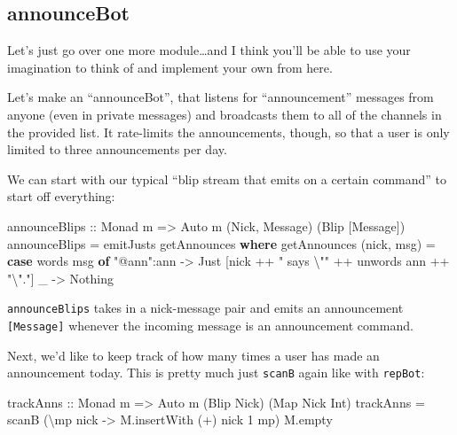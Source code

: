 \documentclass[]{article}
\newenvironment{Shaded}{}{}
\newcommand{\KeywordTok}[1]{\textcolor[rgb]{0.00,0.44,0.13}{\textbf{{#1}}}}
\newcommand{\DataTypeTok}[1]{\textcolor[rgb]{0.56,0.13,0.00}{{#1}}}
\newcommand{\DecValTok}[1]{\textcolor[rgb]{0.25,0.63,0.44}{{#1}}}
\newcommand{\StringTok}[1]{\textcolor[rgb]{0.25,0.44,0.63}{{#1}}}
\newcommand{\OtherTok}[1]{\textcolor[rgb]{0.00,0.44,0.13}{{#1}}}
\newcommand{\FunctionTok}[1]{\textcolor[rgb]{0.02,0.16,0.49}{{#1}}}
\newcommand{\NormalTok}[1]{{#1}}
\begin{document}
\subsection{announceBot}\label{announcebot}

Let's just go over one more module\ldots{}and I think you'll be able to use your
imagination to think of and implement your own from here.

Let's make an ``announceBot'', that listens for ``announcement'' messages from
anyone (even in private messages) and broadcasts them to all of the channels in
the provided list. It rate-limits the announcements, though, so that a user is
only limited to three announcements per day.

We can start with our typical ``blip stream that emits on a certain command'' to
start off everything:

\begin{Shaded}
\begin{Highlighting}[]
\OtherTok{announceBlips ::} \DataTypeTok{Monad} \NormalTok{m }\OtherTok{=>} \DataTypeTok{Auto} \NormalTok{m (}\DataTypeTok{Nick}\NormalTok{, }\DataTypeTok{Message}\NormalTok{) (}\DataTypeTok{Blip} \NormalTok{[}\DataTypeTok{Message}\NormalTok{])}
\NormalTok{announceBlips }\FunctionTok{=} \NormalTok{emitJusts getAnnounces}
  \KeywordTok{where}
    \NormalTok{getAnnounces (nick, msg) }\FunctionTok{=}
      \KeywordTok{case} \NormalTok{words msg }\KeywordTok{of}
        \StringTok{"@ann"}\FunctionTok{:}\NormalTok{ann }\OtherTok{->} \DataTypeTok{Just} \NormalTok{[nick }\FunctionTok{++} \StringTok{" says \textbackslash{}""} \FunctionTok{++} \NormalTok{unwords ann }\FunctionTok{++} \StringTok{"\textbackslash{}"."}\NormalTok{]}
        \NormalTok{_          }\OtherTok{->} \DataTypeTok{Nothing}
\end{Highlighting}
\end{Shaded}

\texttt{announceBlips} takes in a nick-message pair and emits an announcement
\texttt{{[}Message{]}} whenever the incoming message is an announcement command.

Next, we'd like to keep track of how many times a user has made an announcement
today. This is pretty much just \texttt{scanB} again like with \texttt{repBot}:

\begin{Shaded}
\begin{Highlighting}[]
\OtherTok{trackAnns ::} \DataTypeTok{Monad} \NormalTok{m }\OtherTok{=>} \DataTypeTok{Auto} \NormalTok{m (}\DataTypeTok{Blip} \DataTypeTok{Nick}\NormalTok{) (}\DataTypeTok{Map} \DataTypeTok{Nick} \DataTypeTok{Int}\NormalTok{)}
\NormalTok{trackAnns }\FunctionTok{=} \NormalTok{scanB (\textbackslash{}mp nick }\OtherTok{->} \NormalTok{M.insertWith (}\FunctionTok{+}\NormalTok{) nick }\DecValTok{1} \NormalTok{mp) M.empty}
\end{Highlighting}
\end{Shaded}
\end{document}
